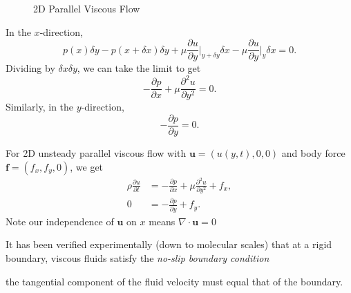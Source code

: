 \documentclass[12pt]{article}
\begin{document}
\begin{figure}[h]
	\centering
	\caption{2D Parallel Viscous Flow}
	\label{fig:2d_viscous_flow}
\end{figure}

In the $x$-direction,
\[
p(x) \delta y - p(x + \delta x)\delta y + \mu \frac{\partial u}{\partial y} \biggr|_{y + \delta y} \delta x - \mu \frac{\partial u}{\partial y} \biggr|_y \delta x = 0
.\]
Dividing by $\delta x \delta y$, we can take the limit to get
\[
- \frac{\partial p}{\partial x} + \mu \frac{\partial^2 u}{\partial y^2} = 0
.\]
Similarly, in the $y$-direction,
\[
- \frac{\partial p}{\partial y} = 0
.\]

For 2D unsteady parallel viscous flow with $\mathbf{u} = (u(y, t), 0, 0)$ and body force $\mathbf{f} = (f_x, f_y, 0)$, we get
\begin{align*}
	\rho \frac{\partial u}{\partial t} &= - \frac{\partial p}{\partial x} + \mu \frac{\partial^2 u}{\partial y^2} + f_x, \\
	0 &= - \frac{\partial p}{\partial y} + f_y.
\end{align*}
Note our independence of $\mathbf{u}$ on $x$ means $\nabla \cdot \mathbf{u} = 0$ 

It has been verified experimentally (down to molecular scales) that at a rigid boundary, viscous fluids satisfy the \emph{no-slip boundary condition}
\begin{center}
	the tangential component of the fluid velocity must equal that of the boundary.
\end{center}
\end{document}
